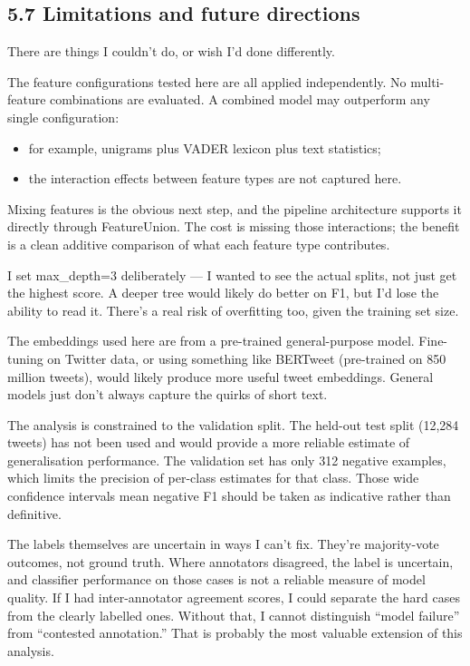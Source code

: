 \documentclass[12pt]{article}
\begin{document}
\subsection*{5.7 Limitations and future directions}



There are things I couldn't do, or wish I'd done differently.

The feature configurations tested here are all applied independently. No multi-feature combinations are evaluated. A combined model may outperform any single configuration:

\begin{itemize}

  \item for example, unigrams plus VADER lexicon plus text statistics;

  \item the interaction effects between feature types are not captured here.

\end{itemize} Mixing features is the obvious next step, and the pipeline architecture supports it directly through FeatureUnion. The cost is missing those interactions; the benefit is a clean additive comparison of what each feature type contributes.

I set max\_depth=3 deliberately --- I wanted to see the actual splits, not just get the highest score.
A deeper tree would likely do better on F1, but I'd lose the ability to read it.
There's a real risk of overfitting too, given the training set size.

The embeddings used here are from a pre-trained general-purpose model. Fine-tuning on Twitter data, or using something like BERTweet (pre-trained on 850 million tweets), would likely produce more useful tweet embeddings. General models just don't always capture the quirks of short text.

The analysis is constrained to the validation split. The held-out test split (12,284 tweets) has not been used and would provide a more reliable estimate of generalisation performance. The validation set has only 312 negative examples, which limits the precision of per-class estimates for that class. Those wide confidence intervals mean negative F1 should be taken as indicative rather than definitive.

The labels themselves are uncertain in ways I can't fix. They're majority-vote outcomes, not ground truth. Where annotators disagreed, the label is uncertain, and classifier performance on those cases is not a reliable measure of model quality. If I had inter-annotator agreement scores, I could separate the hard cases from the clearly labelled ones. Without that, I cannot distinguish ``model failure'' from ``contested annotation.'' That is probably the most valuable extension of this analysis.
\end{document}
